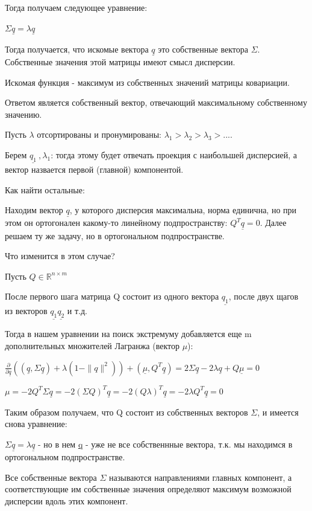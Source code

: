\documentclass[a4paper, 12pt]{article}
\begin{document}
	Тогда получаем следующее уравнение:
	
	$\Sigma \underline{q} = \lambda \underline{q}$
	
	Тогда получается, что искомые вектора $\underline{q}$ это собственные вектора $\Sigma$. Собственные значения этой матрицы имеют смысл дисперсии.
	
	Искомая функция - максимум из собственных значений матрицы ковариации. 
	
	Ответом является собственный вектор, отвечающий максимальному собственному значению.
	
	Пусть $\lambda$ отсортированы и пронумированы: $\lambda_1 > \lambda_2 >\lambda_3 >....$
	
	Берем $\underline{q_1}\:, \lambda_1$: тогда этому будет отвечать проекция с наибольшей дисперсией, а вектор назвается первой (главной) компонентой.
	
	Как найти остальные: 
	
	Находим вектор $\underline{q}$, у которого дисперсия максимальна, норма единична, но при этом он ортогонален какому-то линейному подпространству: $Q^T\underline{q} = 0$. Далее решаем ту же задачу, но в ортогональном подпространстве.
	
	Что изменится в этом случае? 
	
	Пусть $Q \in  \mathbb {R}^{n\times m}$
	
	После первого шага матрица Q состоит из одного вектора $\underline{q_1}$, после двух щагов из векторов $\underline{q_1}$$\underline{q_2}$ и т.д.
	
	Тогда в нашем уравнении на поиск экстремуму добавляется еще m дополнительных множителей Лагранжа (вектор $\mu$):
	
	$\frac{\partial }{\partial \underline{q}}((\underline{q}, \Sigma \underline{q}) + \lambda (1 - \|q\|^2)) + (\underline{\mu}, Q^T\underline{q}) = 2 \Sigma\underline{q} - 2 \lambda \underline{q} + Q\underline{\mu} = 0$
	
	$\mu = -2 Q^T\Sigma\underline{q} = -2(\Sigma Q)^T\underline{q} = -2(Q\lambda)^T\underline{q} = -2\lambda Q^T\underline{q} = 0$
	
	Таким образом получаем, что Q состоит из собственных векторов $\Sigma$, и имеется снова уравнение: 
	
	$\Sigma \underline{q} = \lambda \underline{q}$ - но в нем \underline{q} - уже не все собственнные вектора, т.к. мы находимся в ортогональном подпространстве.
	
	Все собственные вектора $\Sigma$ называются направлениями главных компонент, а соответствующие им собственные значения определяют максимум возможной дисперсии вдоль этих компонент.
	
\end{document}
